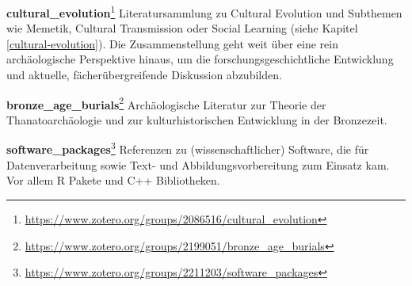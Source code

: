 \documentclass[openany,twoside,twocolumn]{book}
\let\rmarkdownfootnote\footnote%
\def\footnote{\protect\rmarkdownfootnote}
\begin{document}
\textbf{cultural\_evolution}\footnote{\url{https://www.zotero.org/groups/2086516/cultural_evolution}} \newline 
Literatursammlung zu Cultural Evolution und Subthemen wie Memetik, Cultural Transmission oder Social Learning (siehe Kapitel \ref{cultural-evolution}). Die Zusammenstellung geht weit über eine rein archäologische Perspektive hinaus, um die forschungsgeschichtliche Entwicklung und aktuelle, fächerübergreifende Diskussion abzubilden.

\textbf{bronze\_age\_burials}\footnote{\url{https://www.zotero.org/groups/2199051/bronze_age_burials}} \newline 
Archäologische Literatur zur Theorie der Thanatoarchäologie und zur kulturhistorischen Entwicklung in der Bronzezeit.

\textbf{software\_packages}\footnote{\url{https://www.zotero.org/groups/2211203/software_packages}} \newline 
Referenzen zu (wissenschaftlicher) Software, die für Datenverarbeitung sowie Text- und Abbildungsvorbereitung zum Einsatz kam. Vor allem R Pakete und C++ Bibliotheken.
\end{document}
